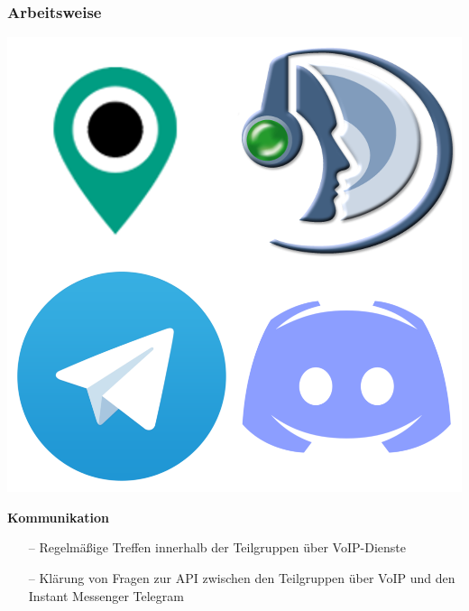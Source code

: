 \documentclass[aspectratio=1610]{beamer}
\begin{document}
    \begin{frame}[plain]
            \frametitle{\textbf{Arbeitsweise}}
            \begin{minipage}{0.5\textwidth}
        	    \includegraphics[width = \columnwidth - 30pt]
                {images/meet-im-voip.png}
            \end{minipage}%
            \begin{minipage}{0.5\textwidth}
                \textbf{Kommunikation}
                \begin{itemize}
                    \setlength\itemsep{0.3em}
                    \item[--] Regelmäßige Treffen innerhalb der Teilgruppen
                        über VoIP-Dienste
                    \item[--] Klärung von Fragen zur API zwischen den
                        Teilgruppen über VoIP und den Instant Messenger
                        Telegram
                \end{itemize}
            \end{minipage}
    \end{frame}


\end{document}
